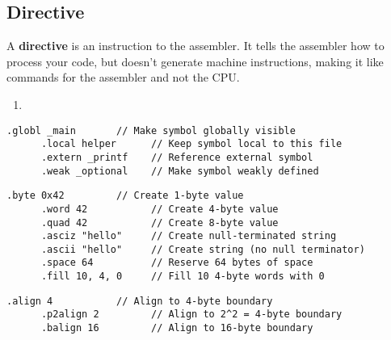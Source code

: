   \begin{definition}
    
  \end{definition} 

\subsection{Directive}

  \begin{definition}[Directive]
    A \textbf{directive} is an instruction to the assembler. It tells the assembler how to process your code, but doesn't generate machine instructions, making it like commands for the assembler and not the CPU. 

    \begin{enumerate}
      \item 
    \end{enumerate}
  \end{definition}

  \begin{example}
    \begin{lstlisting}[language=assembly]
      .globl _main       // Make symbol globally visible
      .local helper      // Keep symbol local to this file
      .extern _printf    // Reference external symbol
      .weak _optional    // Make symbol weakly defined
    \end{lstlisting}
  \end{example}

  \begin{example}
    \begin{lstlisting}[language=assembly]
      .byte 0x42         // Create 1-byte value
      .word 42           // Create 4-byte value  
      .quad 42           // Create 8-byte value
      .asciz "hello"     // Create null-terminated string
      .ascii "hello"     // Create string (no null terminator)
      .space 64          // Reserve 64 bytes of space
      .fill 10, 4, 0     // Fill 10 4-byte words with 0
    \end{lstlisting}
  \end{example}

  \begin{example}[Alignment]
    \begin{lstlisting}[language=assembly]
      .align 4           // Align to 4-byte boundary
      .p2align 2         // Align to 2^2 = 4-byte boundary  
      .balign 16         // Align to 16-byte boundary
    \end{lstlisting}
  \end{example}

